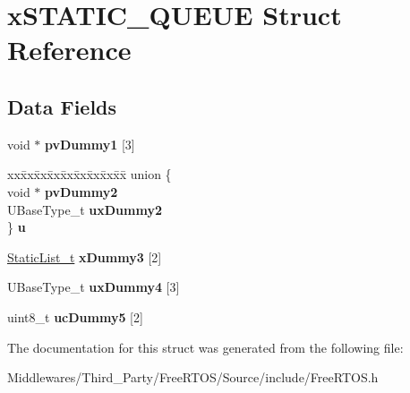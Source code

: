 \hypertarget{structx_s_t_a_t_i_c___q_u_e_u_e}{}\section{x\+S\+T\+A\+T\+I\+C\+\_\+\+Q\+U\+E\+UE Struct Reference}
\label{structx_s_t_a_t_i_c___q_u_e_u_e}
\subsection*{Data Fields}
\begin{DoxyCompactItemize}
\item 
\mbox{\label{structx_s_t_a_t_i_c___q_u_e_u_e_ac563d82b4c6a843835118229de328aa7}} 
void $\ast$ {\bfseries pv\+Dummy1} \mbox{[}3\mbox{]}
\item 
\mbox{\label{structx_s_t_a_t_i_c___q_u_e_u_e_a3996bb2c29b85697d603315ec3303143}} 
\begin{tabbing}
xx\=xx\=xx\=xx\=xx\=xx\=xx\=xx\=xx\=\kill
union \{\\
\>void $\ast$ {\bfseries pvDummy2}\\
\>UBaseType\_t {\bfseries uxDummy2}\\
\} {\bfseries u}\\

\end{tabbing}\item 
\mbox{\label{structx_s_t_a_t_i_c___q_u_e_u_e_a2ea20ae87a814cd673deba85bbc35e5b}} 
\mbox{\hyperlink{structx_s_t_a_t_i_c___l_i_s_t}{Static\+List\+\_\+t}} {\bfseries x\+Dummy3} \mbox{[}2\mbox{]}
\item 
\mbox{\label{structx_s_t_a_t_i_c___q_u_e_u_e_a8c2bd4532fb12e9c4ca67d2a5b0afc1a}} 
U\+Base\+Type\+\_\+t {\bfseries ux\+Dummy4} \mbox{[}3\mbox{]}
\item 
\mbox{\label{structx_s_t_a_t_i_c___q_u_e_u_e_aad619753f8d76e096e76fbf07502d2c9}} 
uint8\+\_\+t {\bfseries uc\+Dummy5} \mbox{[}2\mbox{]}
\end{DoxyCompactItemize}


The documentation for this struct was generated from the following file\+:\begin{DoxyCompactItemize}
\item 
Middlewares/\+Third\+\_\+\+Party/\+Free\+R\+T\+O\+S/\+Source/include/Free\+R\+T\+O\+S.\+h\end{DoxyCompactItemize}
